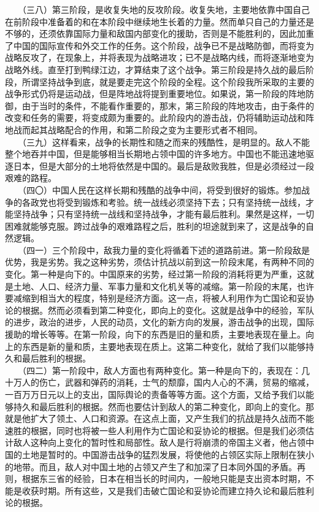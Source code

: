\documentclass[cn,11pt,chinese]{elegantbook}
\begin{document}
　　（三八）第三阶段，是收复失地的反攻阶段。收复失地，主要地依靠中国自己在前阶段中准备着的和在本阶段中继续地生长着的力量。然而单只自己的力量还是不够的，还须依靠国际力量和敌国内部变化的援助，否则是不能胜利的，因此加重了中国的国际宣传和外交工作的任务。这个阶段，战争已不是战略防御，而将变为战略反攻了，在现象上，并将表现为战略进攻；已不是战略内线，而将逐渐地变为战略外线。直至打到鸭绿江边，才算结束了这个战争。第三阶段是持久战的最后阶段，所谓坚持战争到底，就是要走完这个阶段的全程。这个阶段我所采取的主要的战争形式仍将是运动战，但是阵地战将提到重要地位。如果说，第一阶段的阵地防御，由于当时的条件，不能看作重要的，那末，第三阶段的阵地攻击，由于条件的改变和任务的需要，将变成颇为重要的。此阶段内的游击战，仍将辅助运动战和阵地战而起其战略配合的作用，和第二阶段之变为主要形式者不相同。\\
　　（三九）这样看来，战争的长期性和随之而来的残酷性，是明显的。敌人不能整个地吞并中国，但是能够相当长期地占领中国的许多地方。中国也不能迅速地驱逐日本，但是大部分的土地将依然是中国的。最后是敌败我胜，但是必须经过一段艰难的路程。\\
　　（四〇）中国人民在这样长期和残酷的战争中间，将受到很好的锻炼。参加战争的各政党也将受到锻炼和考验。统一战线必须坚持下去；只有坚持统一战线，才能坚持战争；只有坚持统一战线和坚持战争，才能有最后胜利。果然是这样，一切困难就能够克服。跨过战争的艰难路程之后，胜利的坦途就到来了，这是战争的自然逻辑。\\
　　（四一）三个阶段中，敌我力量的变化将循着下述的道路前进。第一阶段敌是优势，我是劣势。我之这种劣势，须估计抗战以前到这一阶段末尾，有两种不同的变化。第一种是向下的。中国原来的劣势，经过第一阶段的消耗将更为严重，这就是土地、人口、经济力量、军事力量和文化机关等的减缩。第一阶段的末尾，也许要减缩到相当大的程度，特别是经济方面。这一点，将被人利用作为亡国论和妥协论的根据。然而必须看到第二种变化，即向上的变化。这就是战争中的经验，军队的进步，政治的进步，人民的动员，文化的新方向的发展，游击战争的出现，国际援助的增长等等。在第一阶段，向下的东西是旧的量和质，主要地表现在量上。向上的东西是新的量和质，主要地表现在质上。这第二种变化，就给了我们以能够持久和最后胜利的根据。\\
　　（四二）第一阶段中，敌人方面也有两种变化。第一种是向下的，表现在：几十万人的伤亡，武器和弹药的消耗，士气的颓靡，国内人心的不满，贸易的缩减，一百万万日元以上的支出，国际舆论的责备等等方面。这个方面，又给予我们以能够持久和最后胜利的根据。然而也要估计到敌人的第二种变化，即向上的变化。那就是他扩大了领土、人口和资源。在这点上面，又产生我们的抗战是持久战而不能速胜的根据，同时也将被一些人利用作为亡国论和妥协论的根据。但是我们必须估计敌人这种向上变化的暂时性和局部性。敌人是行将崩溃的帝国主义者，他占领中国的土地是暂时的。中国游击战争的猛烈发展，将使他的占领区实际上限制在狭小的地带。而且，敌人对中国土地的占领又产生了和加深了日本同外国的矛盾。再则，根据东三省的经验，日本在相当长的时间内，一般地只能是支出资本时期，不能是收获时期。所有这些，又是我们击破亡国论和妥协论而建立持久论和最后胜利论的根据。\\
\end{document}
